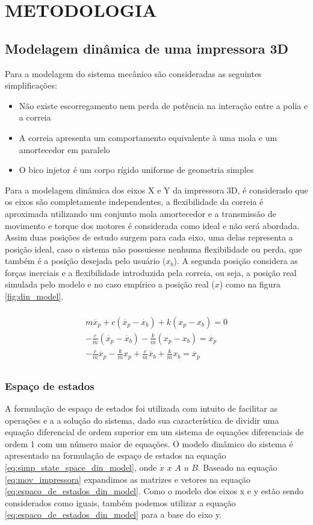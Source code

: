 \chapter{METODOLOGIA}

\section{Modelagem dinâmica de uma impressora 3D}
Para a modelagem do sistema mecânico são consideradas as seguintes simplificações:
\begin{itemize}
    \item Não existe escorregamento nem perda de potência na interação entre a polia e a correia
    \item A correia apresenta um comportamento equivalente à uma mola e um amortecedor em paralelo
    \item O bico injetor é um corpo rígido uniforme de geometria simples
\end{itemize}

Para a modelagem dinâmica dos eixos X e Y da impressora 3D, 
é considerado que os eixos são completamente independentes, 
a flexibilidade da correia é aproximada utilizando um conjunto 
mola amortecedor e a transmissão de movimento e torque dos 
motores é considerada como ideal e não será abordada.
Assim duas posições de estudo surgem para cada eixo, uma delas 
representa a posição ideal, caso o sistema não possuiesse nenhuma flexibilidade
ou perda, que também é a posição desejada pelo usuário ($x_b$). 
A segunda posição considera as forças inerciais e a 
flexibilidade introduzida pela correia, ou seja, a posição real simulada pelo modelo
e no caso empírico a posição real ($x$) como na figura \ref{fig:din_model}.

\begin{multline}
    \label{eq:mov_impressora}
    \\
    m \ddot{x_p} + c(\dot{x_p} - \dot{x_b}) + k(x_p-x_b) = 0 \\
    - \frac{c}{m}(\dot{x_p} - \dot{x_b}) - \frac{k}{m}(x_p-x_b) = \ddot{x_p} \\
    - \frac{c}{m} \dot{x_p} - \frac{k}{m} x_p + \frac{c}{m} \dot{x_b} + \frac{k}{m} x_b  = \ddot{x_p} \\
\end{multline}

\subsection{Espaço de estados}
A formulação de espaço de estados foi utilizada com intuito de facilitar as operações e
a a solução do sistema, dado sua característica de dividir uma equação diferencial
de ordem superior em um sistema de equações diferenciais de ordem 1 com um número maior de equações.
O modelo dinâmico do sistema é apresentado na formulação de espaço de estados 
na equação \ref{eq:simp_state_space_din_model}, onde $\dot x$ $x$ $A$ $u$ $B$.
Baseado na equação \ref{eq:mov_impressora} expandimos as matrizes e vetores na equação 
\ref{eq:espaco_de_estados_din_model}.
Como o modelo dos eixos x e y estão sendo considerados como iguais, também podemos utilizar a equação 
\ref{eq:espaco_de_estados_din_model} para a base do eixo y.

